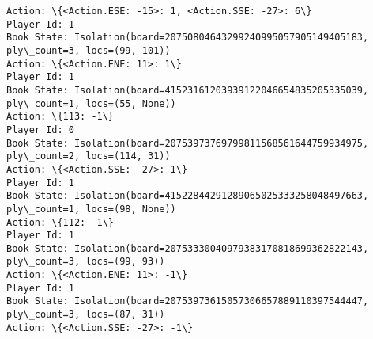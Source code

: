 \documentclass[11pt]{article}
\begin{document}
\begin{Verbatim}[commandchars=\\\{\}]
Action: \{<Action.ESE: -15>: 1, <Action.SSE: -27>: 6\}
Player Id: 1
Book State: Isolation(board=20750804643299240995057905149405183, ply\_count=3, locs=(99, 101))
Action: \{<Action.ENE: 11>: 1\}
Player Id: 1
Book State: Isolation(board=41523161203939122046654835205335039, ply\_count=1, locs=(55, None))
Action: \{113: -1\}
Player Id: 0
Book State: Isolation(board=20753973769799811568561644759934975, ply\_count=2, locs=(114, 31))
Action: \{<Action.SSE: -27>: 1\}
Player Id: 1
Book State: Isolation(board=41522844291289065025333258048497663, ply\_count=1, locs=(98, None))
Action: \{112: -1\}
Player Id: 1
Book State: Isolation(board=20753330040979383170818699362822143, ply\_count=3, locs=(99, 93))
Action: \{<Action.ENE: 11>: -1\}
Player Id: 1
Book State: Isolation(board=20753973615057306657889110397544447, ply\_count=3, locs=(87, 31))
Action: \{<Action.SSE: -27>: -1\}


\end{Verbatim}
\end{document}
